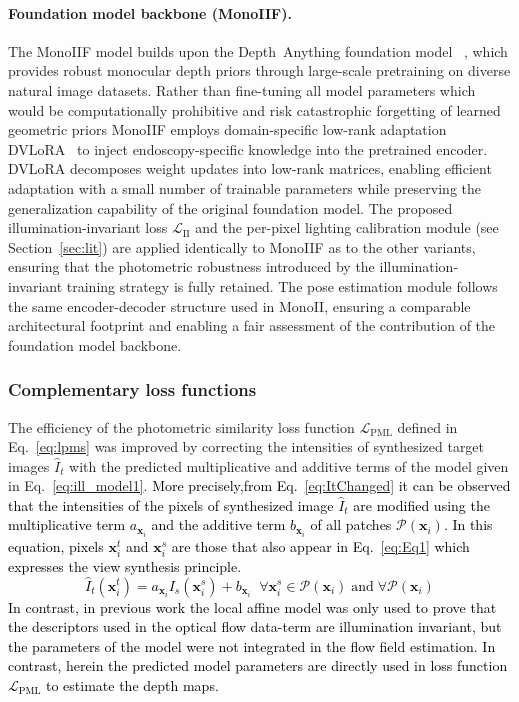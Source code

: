 \documentclass[a4paper,fleqn]{cas-dc}
\begin{document}
{\paragraph{Foundation model backbone (MonoIIF).}
The MonoIIF model builds upon the Depth~Anything foundation model ~\citep{yang2024depth}, which provides robust monocular depth priors through large-scale pretraining on diverse natural image datasets. Rather than fine-tuning all model parameters which would be computationally prohibitive and risk catastrophic forgetting of learned geometric priors MonoIIF employs domain-specific low-rank adaptation DVLoRA~\citep{cui2024endodac} to inject endoscopy-specific knowledge into the pretrained encoder. DVLoRA decomposes weight updates into low-rank matrices, enabling efficient adaptation with a small number of trainable parameters while preserving the generalization capability of the original foundation model. The proposed illumination-invariant loss $\mathcal{L}_\text{II}$ and the per-pixel lighting calibration module (see Section~\ref{sec:lit}) are applied identically to MonoIIF as to the other variants, ensuring that the photometric robustness introduced by the illumination-invariant training strategy is fully retained. The pose estimation module follows the same encoder-decoder structure used in MonoII, ensuring a comparable architectural footprint and enabling a fair assessment of the contribution of the foundation model backbone.
%
\subsubsection{Complementary loss functions \label{sec:clf}}
%
%
The efficiency of the photometric similarity loss function $\mathcal{L}_{\textrm{PML}}$ defined in Eq.~\eqref{eq:lpms} was improved by correcting the intensities of synthesized target images $\hat{I}_t$ with the predicted multiplicative and additive terms of the model given in Eq.~\eqref{eq:ill_model1}. \textcolor{black}{More precisely,from Eq.~\eqref{eq:ItChanged} it can be observed that the intensities of the pixels of synthesized image $\hat{I}_t$ are modified using the multiplicative term $a_{\mathbf{x}_i}$ and the additive term $b_{\mathbf{x}_i}$ of all patches $\mathcal{P}({\mathbf{x}_i})$. In this equation, pixels $\mathbf{x}^t_i$ and $\mathbf{x}^s_i$ are those that also appear in Eq.~\eqref{eq:Eq1} which expresses the view synthesis principle.}
%
\textcolor{black}{
\begin{equation} \label{eq:ItChanged}
\hat{I}_t\left(\mathbf{x}^t_i\right) = 
  a_{\mathbf{x}_i}I_s\left(\mathbf{x}^s_i\right) + b_{\mathbf{x}_i} \;\; \forall{\mathbf{x}^s_i \in \mathcal{P}({\mathbf{x}_i}) \; \textrm{and} \; \forall{\mathcal{P}({\mathbf{x}_i})}} 
\end{equation}
}
\textcolor{black}{In contrast, in previous work \citep{Trinh_CVIU_2019} the local affine model was only used to prove that the descriptors used in the optical flow data-term are illumination invariant, but the parameters of the model were not integrated in the flow field estimation. In contrast, herein the predicted model parameters are directly used in loss function $\mathcal{L}_{\textrm{PML}}$ to estimate the depth maps.}
%

}
\end{document}
